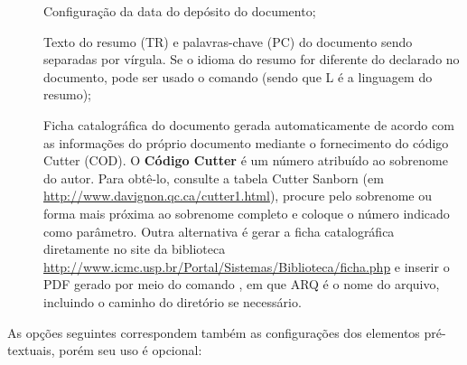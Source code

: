 \begin{description}
 \item[] Configuração da data do depósito do documento;

 \item[] Texto do resumo (TR) e palavras-chave (PC) do documento sendo separadas por vírgula. Se o idioma do resumo for diferente do declarado no documento, pode ser usado o comando  (sendo que L é a linguagem do resumo);
 
 \item[] Ficha catalográfica do documento gerada automaticamente de acordo com as informações do próprio documento mediante o fornecimento do código Cutter (COD). O \textbf{Código Cutter} é um número atribuído ao sobrenome do autor. Para obtê-lo, consulte a tabela Cutter Sanborn (em \url{http://www.davignon.qc.ca/cutter1.html}), procure pelo sobrenome ou forma mais próxima ao sobrenome completo e coloque o número indicado como parâmetro. Outra alternativa é gerar a ficha catalográfica diretamente no site da biblioteca \url{http://www.icmc.usp.br/Portal/Sistemas/Biblioteca/ficha.php} e inserir o PDF gerado por meio do comando , em que ARQ é o nome do arquivo, incluindo o caminho do diretório se necessário.

 
\end{description}

As opções seguintes correspondem também as configurações dos elementos pré-textuais, porém seu uso é opcional: 

